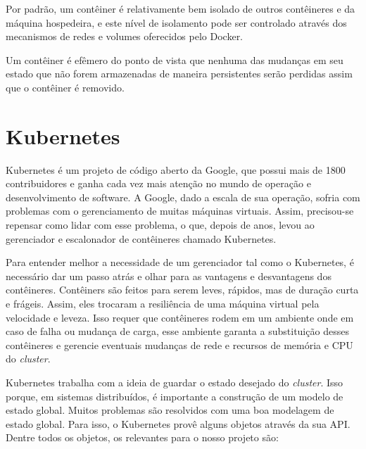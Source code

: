     	        Por padrão, um contêiner é relativamente bem isolado de outros contêineres e da máquina hospedeira, e este nível de isolamento pode ser controlado através dos mecanismos de redes e volumes oferecidos pelo Docker.
    	
    	        Um contêiner é efêmero do ponto de vista que nenhuma das mudanças em seu estado que não forem armazenadas de maneira persistentes serão perdidas assim que o contêiner é removido. \cite{dockeroverview}
	
	
	\section{Kubernetes}
	    Kubernetes é um projeto de código aberto da Google, que possui mais de 1800 contribuidores e ganha cada vez mais atenção no mundo de operação e desenvolvimento de software. 
	    A Google, dado a escala de sua operação, sofria com problemas com o gerenciamento de muitas máquinas virtuais. 
    	Assim, precisou-se repensar como lidar com esse problema, o que, depois de anos, levou ao gerenciador e escalonador de contêineres chamado Kubernetes.

    	Para entender melhor a necessidade de um gerenciador tal como o Kubernetes, é necessário dar um passo atrás e olhar para as vantagens e desvantagens dos contêineres.
    	Contêiners são feitos para serem leves, rápidos, mas de duração curta e frágeis.
    	Assim, eles trocaram a resiliência de uma máquina virtual pela velocidade e leveza. Isso requer que contêineres rodem em um ambiente onde em caso de falha ou mudança de carga, esse ambiente garanta a substituição desses contêineres e gerencie eventuais mudanças de rede e recursos de memória e CPU do \textit{cluster}.
    	
    	Kubernetes trabalha com a ideia de guardar o estado desejado do \textit{cluster}. Isso porque, em sistemas distribuídos, é importante a construção de um modelo de estado global.\cite{globalstate} Muitos problemas são resolvidos com uma boa modelagem de estado global. Para isso, o Kubernetes provê alguns objetos através da sua API. Dentre todos os objetos, os relevantes para o nosso projeto são:
    	
